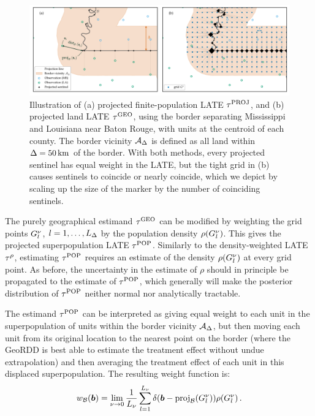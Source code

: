 \begin{figure}[tb]
    \centering
    \includegraphics[width=\textwidth]{figures/mississippi_projection_methods.pdf}
    \caption{
        \label{fig:mississippi_projection_methods}
        Illustration of (a) projected finite-population LATE \(\tau^{\mathrm{PROJ}}\), and (b) projected land LATE \(\tau^{\mathrm{GEO}}\), using the border separating Mississippi and Louisiana near Baton Rouge, with units at the centroid of each county.
        The border vicinity \(\mathcal{A}_\Delta\) is defined as all land within \(\Delta=50\,\mathrm{km}\) of the border.
    With both methods, every projected sentinel has equal weight in the LATE, but the tight grid in (b) causes sentinels to coincide or nearly coincide, which we depict by scaling up the size of the marker by the number of coinciding sentinels.}
\end{figure}

    The purely geographical estimand \(\tau^{\mathrm{GEO}}\) can be modified by weighting the grid points \(G^\nu_l\), \(l=1,\dotsc,L_\Delta\) by the population density \(\rho(G^\nu_l)\).
This gives the projected superpopulation LATE \(\tau^{\mathrm{POP}}\).
Similarly to the density-weighted LATE \(\tau^{\rho}\), estimating \(\tau^{\mathrm{POP}}\) requires an estimate of the density \(\rho(G^\nu_l)\) at every grid point.
As before, the uncertainty in the estimate of \(\rho\) should in principle be propagated to the estimate of \(\tau^{\mathrm{POP}}\), which generally will make the posterior distribution of \(\tau^{\mathrm{POP}}\) neither normal nor analytically tractable.

    The estimand \(\tau^{\mathrm{POP}}\) can be interpreted as giving equal weight to each unit in the superpopulation of units within the border vicinity \(\mathcal{A}_\Delta\), but then moving each unit from its original location to the nearest point on the border (where the GeoRDD is best able to estimate the treatment effect without undue extrapolation) and then averaging the treatment effect of each unit in this displaced superpopulation.
The resulting weight function is:
\begin{equation}
    \weightb(\sentinel) =
        \lim_{\gridres \rightarrow 0}
        \frac{1}{L_\gridres}
        \sum_{l=1}^{L_\gridres}
            \delta\del{\sentinel - \proj_{\border}\del{\grid_l} }
            \rho(\grid_l)
        \,.
\end{equation}

